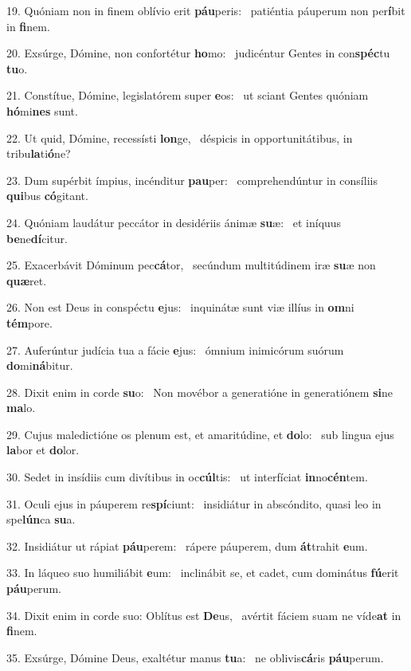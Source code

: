 19. Quóniam non in finem oblívio erit \textbf{páu}peris: \ast\  patiéntia páuperum non per\textbf{í}bit in \textbf{fi}nem.\

20. Exsúrge, Dómine, non confortétur \textbf{ho}mo: \ast\  judicéntur Gentes in con\textbf{spéc}tu \textbf{tu}o.\

21. Constítue, Dómine, legislatórem super \textbf{e}os: \ast\  ut sciant Gentes quóniam \textbf{hó}mi\textbf{nes} sunt.\

22. Ut quid, Dómine, recessísti \textbf{lon}ge, \ast\  déspicis in opportunitátibus, in tribu\textbf{la}ti\textbf{ó}ne?\

23. Dum supérbit ímpius, incénditur \textbf{pau}per: \ast\  comprehendúntur in consíliis \textbf{qui}bus \textbf{có}gitant.\

24. Quóniam laudátur peccátor in desidériis ánimæ \textbf{su}æ: \ast\  et iníquus \textbf{be}ne\textbf{dí}citur.\

25. Exacerbávit Dóminum pec\textbf{cá}tor, \ast\  secúndum multitúdinem iræ \textbf{su}æ non \textbf{quæ}ret.\

26. Non est Deus in conspéctu \textbf{e}jus: \ast\  inquinátæ sunt viæ illíus in \textbf{om}ni \textbf{tém}pore.\

27. Auferúntur judícia tua a fácie \textbf{e}jus: \ast\  ómnium inimicórum suórum \textbf{do}mi\textbf{ná}bitur.\

28. Dixit enim in corde \textbf{su}o: \ast\  Non movébor a generatióne in generatiónem \textbf{si}ne \textbf{ma}lo.\

29. Cujus maledictióne os plenum est, et amaritúdine, et \textbf{do}lo: \ast\  sub lingua ejus \textbf{la}bor et \textbf{do}lor.\

30. Sedet in insídiis cum divítibus in oc\textbf{cúl}tis: \ast\  ut interfíciat \textbf{in}no\textbf{cén}tem.\

31. Oculi ejus in páuperem re\textbf{spí}ciunt: \ast\  insidiátur in abscóndito, quasi leo in spe\textbf{lún}ca \textbf{su}a.\

32. Insidiátur ut rápiat \textbf{páu}perem: \ast\  rápere páuperem, dum \textbf{át}trahit \textbf{e}um.\

33. In láqueo suo humiliábit \textbf{e}um: \ast\  inclinábit se, et cadet, cum dominátus \textbf{fú}erit \textbf{páu}perum.\

34. Dixit enim in corde suo: Oblítus est \textbf{De}us, \ast\  avértit fáciem suam ne víde\textbf{at} in \textbf{fi}nem.\

35. Exsúrge, Dómine Deus, exaltétur manus \textbf{tu}a: \ast\  ne oblivis\textbf{cá}ris \textbf{páu}perum.\

